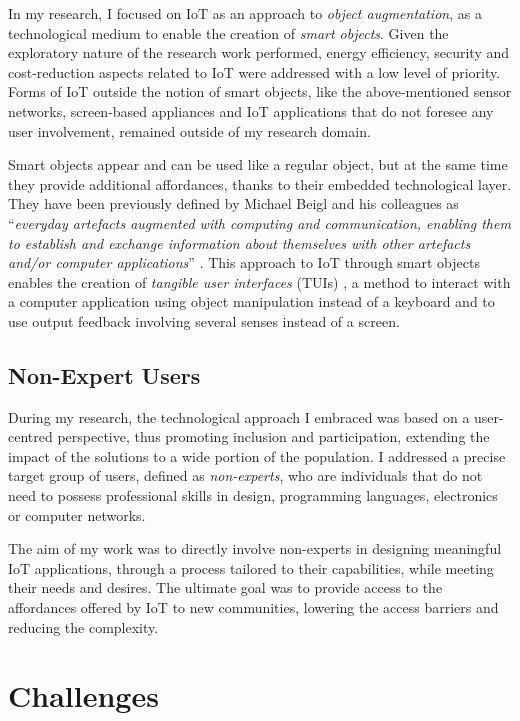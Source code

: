 In my research, I focused on IoT as an approach to \textit{object augmentation}, as a technological medium to enable the creation of \textit{smart objects}. Given the exploratory nature of the research work performed, energy efficiency, security and cost-reduction aspects related to IoT were addressed with a low level of priority. Forms of IoT outside the notion of smart objects, like the above-mentioned sensor networks, screen-based appliances and IoT applications that do not foresee any user involvement, remained outside of my research domain. 

Smart objects appear and can be used like a regular object, but at the same time they provide additional affordances, thanks to their embedded technological layer. They have been previously defined by Michael Beigl and his colleagues as \enquote{\textit{everyday artefacts augmented with computing and communication, enabling them to establish and exchange information about themselves with other artefacts and/or computer applications}} \autocite{beigl_mediacups_2001}.
This approach to IoT through smart objects enables the creation of \textit{tangible user interfaces} (TUIs) \autocite{ishii_tangible_1997}, a method to interact with a computer application using object manipulation instead of a keyboard and to use output feedback involving several senses instead of a screen.


\subsection{Non-Expert Users}
\label{sec:non-experts}

During my research, the technological approach I embraced was based on a user-centred perspective, thus promoting inclusion and participation, extending the impact of the solutions to a wide portion of the population. I addressed a precise target group of users, defined as \textit{non-experts}, who are individuals that do not need to possess professional skills in design, programming languages, electronics or computer networks.

The aim of my work was to directly involve non-experts in designing meaningful IoT applications, through a process tailored to their capabilities, while meeting their needs and desires. The ultimate goal was to provide access to the affordances offered by IoT to new communities, lowering the access barriers and reducing the complexity.


\section{Challenges}

